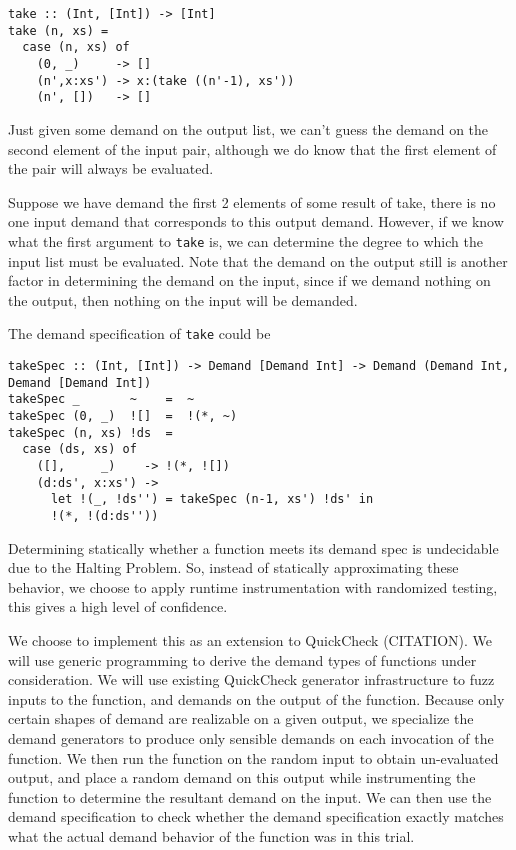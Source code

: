 \documentclass{article}
\begin{document}
\begin{verbatim}
take :: (Int, [Int]) -> [Int]
take (n, xs) =
  case (n, xs) of
    (0, _)     -> []
    (n',x:xs') -> x:(take ((n'-1), xs'))
    (n', [])   -> []
\end{verbatim}

Just given some demand on the output list, we can't guess the demand on the
second element of the input pair, although we do know that the first element of
the pair will always be evaluated.

Suppose we have demand the first 2 elements of some result of take, there is no
one input demand that corresponds to this output demand. However, if we know
what the first argument to \verb|take| is, we can determine the degree to which
the input list must be evaluated. Note that the demand on the output still is
another factor in determining the demand on the input, since if we demand
nothing on the output, then nothing on the input will be demanded.

The demand specification of \verb|take| could be

\begin{verbatim}
takeSpec :: (Int, [Int]) -> Demand [Demand Int] -> Demand (Demand Int, Demand [Demand Int])
takeSpec _       ~    =  ~
takeSpec (0, _)  ![]  =  !(*, ~)
takeSpec (n, xs) !ds  =
  case (ds, xs) of
    ([],     _)    -> !(*, ![])
    (d:ds', x:xs') ->
      let !(_, !ds'') = takeSpec (n-1, xs') !ds' in
      !(*, !(d:ds''))
\end{verbatim}

Determining statically whether a function meets its demand spec is undecidable
due to the Halting Problem. So, instead of statically approximating these
behavior, we choose to apply runtime instrumentation with randomized testing,
this gives a high level of confidence.

We choose to implement this as an extension to QuickCheck (CITATION). We will
use generic programming to derive the demand types of functions under
consideration. We will use existing QuickCheck generator infrastructure to fuzz
inputs to the function, and demands on the output of the function. Because only
certain shapes of demand are realizable on a given output, we specialize the
demand generators to produce only sensible demands on each invocation of the
function. We then run the function on the random input to obtain un-evaluated
output, and place a random demand on this output while instrumenting the
function to determine the resultant demand on the input. We can then use the
demand specification to check whether the demand specification exactly matches
what the actual demand behavior of the function was in this trial.
\end{document}
